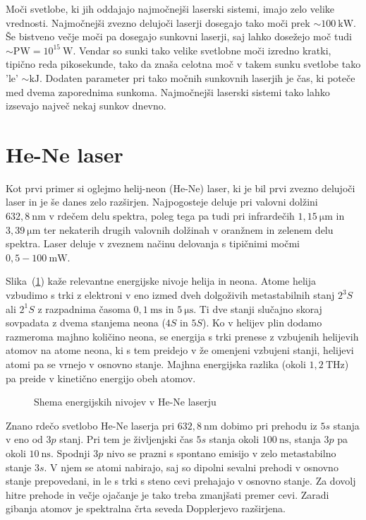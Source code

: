 Moči svetlobe, ki jih oddajajo najmočnejši laserski sistemi, imajo zelo velike
vrednosti. Najmočnejši zvezno delujoči laserji dosegajo tako moči prek 
$\sim 100~\si{\kilo\watt}$. Še bistveno večje moči pa dosegajo sunkovni laserji, 
saj lahko dosežejo moč tudi $\sim \si{\peta\watt} = 10^{15}~\si{\watt}$. 
Vendar so sunki tako velike svetlobne moči izredno kratki, tipično reda pikosekunde, tako da
znaša celotna moč v takem sunku svetlobe tako 'le' $\sim \si{\kilo\joule}$. Dodaten 
parameter pri tako močnih sunkovnih laserjih je čas, ki poteče med dvema zaporednima
sunkoma. Najmočnejši laserski sistemi tako lahko izsevajo največ nekaj sunkov dnevno. 

\section{He-Ne laser}

Kot prvi primer si oglejmo helij-neon (He-Ne) laser, ki je bil prvi zvezno 
delujoči laser in je še danes zelo razširjen. Najpogosteje deluje 
pri valovni dolžini $632,8~\si{\nano\metre}$ v rdečem delu spektra, poleg 
tega pa tudi pri infrardečih $1,15~\si{\micro\metre}$ in 
$3,39~\si{\micro\metre}$ ter nekaterih drugih
valovnih dolžinah v oranžnem in zelenem delu spektra. Laser deluje v zveznem 
načinu delovanja s tipičnimi močmi $0,5 - 100~\si{\milli\watt}$.

Slika~(\ref{fig:HeNeE}) kaže relevantne energijske nivoje helija in neona. Atome helija
vzbudimo s trki z elektroni v eno izmed dveh dolgoživih metastabilnih stanj $2^3S$ ali
$2^1S$ z razpadnima časoma $0,1~\si{\milli\second}$ in $5~\si{\micro\second}$.
Ti dve stanji slučajno skoraj sovpadata z dvema stanjema neona ($4S$ in $5S$). 
Ko v helijev plin dodamo razmeroma majhno količino neona, se energija s trki 
prenese z vzbujenih helijevih atomov na atome neona, ki s tem preidejo v 
že omenjeni vzbujeni stanji, helijevi atomi pa se vrnejo v osnovno stanje. 
Majhna energijska razlika (okoli $1,2~\si{\tera\hertz}$) pa preide v
kinetično energijo obeh atomov. 
\begin{figure}[h]
\centering
\def\svgwidth{100truemm} 

\caption{Shema energijskih nivojev v He-Ne laserju}
\label{fig:HeNeE}
\end{figure}

Znano rdečo svetlobo He-Ne laserja pri $632,8~\si{\nano\metre}$ dobimo 
pri prehodu iz $5s$ stanja v eno od $3p$ stanj. Pri tem je življenjski čas 
$5s$ stanja okoli $100~\si{\nano\second}$, stanja $3p$ pa okoli $10~\si{\nano\second}$.
Spodnji $3p$ nivo se prazni s spontano emisijo v zelo metastabilno stanje $3s$. 
V njem se atomi nabirajo, saj so dipolni sevalni prehodi v osnovno stanje prepovedani,
in le s trki s steno cevi prehajajo v osnovno stanje. Za dovolj hitre prehode in 
večje ojačanje je tako treba zmanjšati premer cevi. Zaradi gibanja atomov je 
spektralna črta seveda Dopplerjevo razširjena. 

